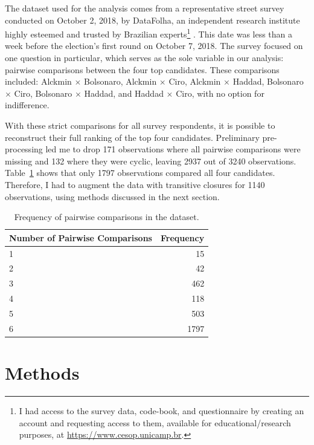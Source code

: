 \documentclass[hidelinks,11pt]{article} \usepackage[utf8]{inputenc}
\begin{document}
The dataset used for the analysis comes from a representative street survey conducted on October 2, 2018, by DataFolha, an independent research institute highly esteemed and trusted by Brazilian experts\footnote{I had access to the
  survey data, code-book, and questionnaire by creating an account and
  requesting access to them, available for educational/research purposes,   at \url{https://www.cesop.unicamp.br}.} . This date was less than a week before the election's first round on October 7, 2018. The survey focused on one question in particular, which serves as the sole variable in our analysis: pairwise comparisons between the four top candidates. These comparisons included: Alckmin \(\times\) Bolsonaro, Alckmin \(\times\) Ciro, Alckmin \(\times\) Haddad, Bolsonaro \(\times\) Ciro, Bolsonaro \(\times\) Haddad, and Haddad \(\times\) Ciro, with no option for indifference.

With these strict comparisons for all survey respondents, it is possible to reconstruct their full ranking of the top four candidates. Preliminary pre-processing led me to drop 171 observations where all pairwise comparisons were missing and 132 where they were cyclic, leaving 2937 out of 3240 observations. Table~\ref{Tab:Tcpairwise} shows that only 1797 observations compared all four candidates. Therefore, I had to augment the data with transitive closures for 1140 observations, using methods discussed in the next section.


\begin{table}[!h]\centering
\begin{tabular}{lr}
\hline
Number of Pairwise Comparisons & Frequency \\ \hline
1                              & 15        \\
2                              & 42        \\
3                              & 462       \\
4                              & 118       \\
5                              & 503       \\
6                              & 1797      \\ \hline
\end{tabular}


\caption{Frequency of pairwise comparisons in the dataset.}

\label{Tab:Tcpairwise}
\end{table}

\section{Methods}
\end{document}
